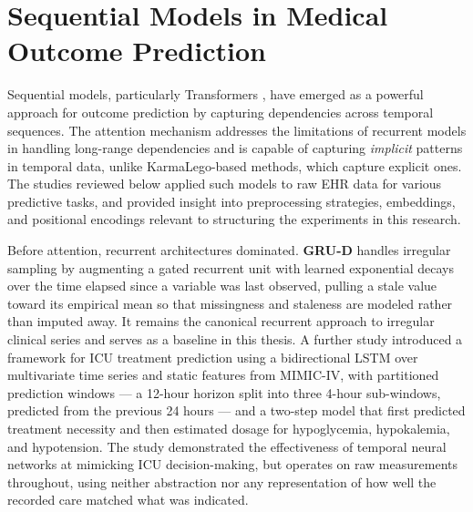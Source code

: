\section{Sequential Models in Medical Outcome Prediction}
\label{sec:rw-sequential}

Sequential models, particularly Transformers \citep{attention-is-all-you-need}, have emerged as a powerful approach for outcome prediction by capturing dependencies across temporal sequences. The attention mechanism addresses the limitations of recurrent models in handling long-range dependencies and is capable of capturing \emph{implicit} patterns in temporal data, unlike KarmaLego-based methods, which capture explicit ones. The studies reviewed below applied such models to raw EHR data for various predictive tasks, and provided insight into preprocessing strategies, embeddings, and positional encodings relevant to structuring the experiments in this research.

Before attention, recurrent architectures dominated. \textbf{GRU-D} \citep{che2018recurrent} handles irregular sampling by augmenting a gated recurrent unit with learned exponential decays over the time elapsed since a variable was last observed, pulling a stale value toward its empirical mean so that missingness and staleness are modeled rather than imputed away. It remains the canonical recurrent approach to irregular clinical series and serves as a baseline in this thesis. A further study \citep{treatment-prediction-icu-partitioned-sequential-deep-time-series-analysis} introduced a framework for ICU treatment prediction using a bidirectional LSTM over multivariate time series and static features from MIMIC-IV, with partitioned prediction windows --- a 12-hour horizon split into three 4-hour sub-windows, predicted from the previous 24 hours --- and a two-step model that first predicted treatment necessity and then estimated dosage for hypoglycemia, hypokalemia, and hypotension. The study demonstrated the effectiveness of temporal neural networks at mimicking ICU decision-making, but operates on raw measurements throughout, using neither abstraction nor any representation of how well the recorded care matched what was indicated.

